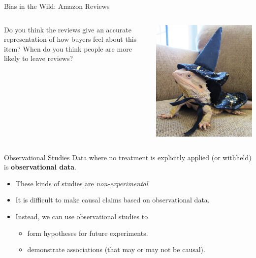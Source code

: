 \begin{frame}{Bias in the Wild: Amazon Reviews}
        \begin{columns}[T] %
    \begin{column}{.48\textwidth}
        \vspace{2cm}
    
        Do you think the reviews give an accurate representation of how buyers feel about this item? When do you think people are more likely to leave reviews?
    \end{column}%
    \hfill%
    \begin{column}{.48\textwidth}
    \includegraphics[scale=0.25]{images/lizard.jpg}
    \end{column}%
    \end{columns}
\end{frame}

\begin{frame}{Observational Studies}
    Data where no treatment is explicitly applied (or withheld) is \textbf{observational data}. 
    \begin{itemize}
        \item These kinds of studies are \textit{non-experimental}.
        \item It is difficult to make causal claims based on observational data.
        \item Instead, we can use observational studies to 
        \begin{itemize}
            \item form hypotheses for future experiments.
            \item demonstrate associations (that may or may not be causal).
        \end{itemize}
    \end{itemize}
\end{frame}

